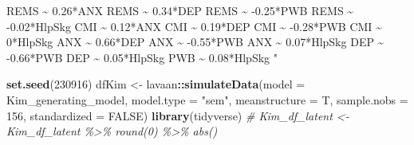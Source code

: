 \documentclass[
  11pt,
]{book}
\newenvironment{Shaded}{\begin{snugshade}}{\end{snugshade}}
\newcommand{\AttributeTok}[1]{\textcolor[rgb]{0.27,0.27,0.27}{#1}}
\newcommand{\CommentTok}[1]{\textcolor[rgb]{0.37,0.37,0.37}{\textit{#1}}}
\newcommand{\ConstantTok}[1]{\textcolor[rgb]{0.37,0.37,0.37}{#1}}
\newcommand{\DecValTok}[1]{\textcolor[rgb]{0.06,0.06,0.06}{#1}}
\newcommand{\FunctionTok}[1]{\textcolor[rgb]{0.27,0.27,0.27}{\textbf{#1}}}
\newcommand{\NormalTok}[1]{#1}
\newcommand{\OtherTok}[1]{\textcolor[rgb]{0.37,0.37,0.37}{#1}}
\newcommand{\SpecialCharTok}[1]{\textcolor[rgb]{0.43,0.43,0.43}{\textbf{#1}}}
\newcommand{\StringTok}[1]{\textcolor[rgb]{0.5,0.5,0.5}{#1}}
\begin{document}
\begin{Shaded}
\begin{Highlighting}[]
\StringTok{         REMS \textasciitilde{} 0.26*ANX}
\StringTok{         REMS \textasciitilde{} 0.34*DEP}
\StringTok{         REMS \textasciitilde{} {-}0.25*PWB}
\StringTok{         REMS \textasciitilde{} {-}0.02*HlpSkg}
\StringTok{         CMI \textasciitilde{} 0.12*ANX}
\StringTok{         CMI \textasciitilde{} 0.19*DEP}
\StringTok{         CMI \textasciitilde{} {-}0.28*PWB}
\StringTok{         CMI \textasciitilde{} 0*HlpSkg}
\StringTok{         ANX \textasciitilde{} 0.66*DEP}
\StringTok{         ANX \textasciitilde{} {-}0.55*PWB}
\StringTok{         ANX \textasciitilde{} 0.07*HlpSkg}
\StringTok{         DEP \textasciitilde{} {-}0.66*PWB}
\StringTok{         DEP \textasciitilde{} 0.05*HlpSkg}
\StringTok{         PWB \textasciitilde{} 0.08*HlpSkg}
\StringTok{        "}

\FunctionTok{set.seed}\NormalTok{(}\DecValTok{230916}\NormalTok{)}
\NormalTok{dfKim }\OtherTok{\textless{}{-}}\NormalTok{ lavaan}\SpecialCharTok{::}\FunctionTok{simulateData}\NormalTok{(}\AttributeTok{model =}\NormalTok{ Kim\_generating\_model, }\AttributeTok{model.type =} \StringTok{"sem"}\NormalTok{,}
    \AttributeTok{meanstructure =}\NormalTok{ T, }\AttributeTok{sample.nobs =} \DecValTok{156}\NormalTok{, }\AttributeTok{standardized =} \ConstantTok{FALSE}\NormalTok{)}
\FunctionTok{library}\NormalTok{(tidyverse)}
\CommentTok{\# Kim\_df\_latent \textless{}{-} Kim\_df\_latent \%\textgreater{}\% round(0) \%\textgreater{}\% abs()}


\end{Highlighting}
\end{Shaded}
\end{document}
